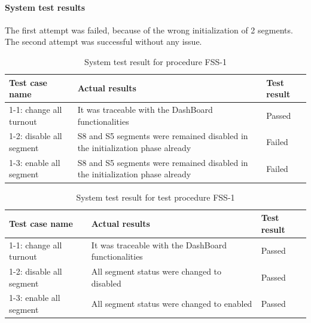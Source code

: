 \paragraph{System test results} The first attempt was failed, because of the wrong initialization of 2 segments. The second attempt was successful without any issue. 
\begin{table}[ht]
	\caption{System test result for procedure FSS-1}
	\label{table:SystemTestProcedure-1-Result1}
	\begin{center}
		\renewcommand{\arraystretch}{1.8}
		\begin{tabu} 
			to 0.9 \textwidth
			{  X[1.5, c] X[1.5, c] X[c]  }
			\toprule
			Test case name           & Actual results                                                                & Test result \\ -1: change all turnout  & It was traceable with the DashBoard functionalities                           & Passed      \\
			1-2: disable all segment & S8 and S5 segments were remained disabled in the initialization phase already & Failed      \\
			1-3: enable all segment  & S8 and S5 segments were remained disabled in the initialization phase already & Failed      \\ \bottomrule
		\end{tabu}
	\end{center}
\end{table}
\begin{table}[ht]
	\caption{System test result for test procedure FSS-1}
	\label{table:SystemTestProcedure-1-Result2}
	\begin{center}
		\renewcommand{\arraystretch}{1.8}
		\begin{tabu} 
			to 0.9 \textwidth
			{  X[1.5, c] X[1.5, c] X[c] }
			\toprule
			Test case name           & Actual results                                      & Test result \\ -1: change all turnout  & It was traceable with the DashBoard functionalities & Passed      \\
			1-2: disable all segment & All segment status were changed to disabled         & Passed      \\
			1-3: enable all segment  & All segment status were changed to enabled          & Passed      \\ \bottomrule
		\end{tabu}
	\end{center}
\end{table}

